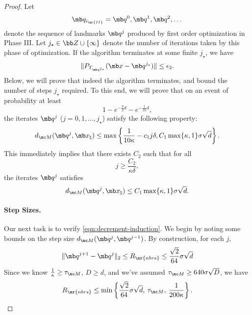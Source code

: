 \begin{proof}
Let 
\begin{equation}
    \mb q_{i_{\mr{II}}} = \mb q^0, \mb q^1, \mb q^2, \dots 
\end{equation}
denote the sequence of landmarks $\mb q^j$ produced by first order optimization in Phase III. Let $j_\star \in \bb Z \cup \{ \infty \}$ denote the number of iterations taken by this phase of optimization. If the algorithm terminates at some finite $j_\star$, we have 
\begin{equation}
    \| P_{T_{\mb q^{j_\star}}} (\mb x - \mb q^{j_\star} ) \| \le \epsilon_2. 
\end{equation}
Below, we will prove that indeed the algorithm terminates, and bound the number of steps $j_\star$ required. To this end, we will prove that on an event of probability at least 
\begin{equation}
    1 - e^{-\tfrac{9}{2} d} - e^{-\tfrac{1}{16} d},
\end{equation}
the iterates $\mb q^j$ ($j = 0,1,\dots, j_\star$) satisfy the following property:
\begin{equation} \label{eqn:decrement-induction}
    d_{\mc M}(\mb q^j, \mb x_\natural) \le \max\left\{ \frac{1}{10\kappa} -  c_1 j \delta, C_1 \max\{ \kappa, 1 \} \sigma \sqrt{d} \right\}.  
\end{equation}
This immediately implies that there exists $C_2$ such that for all 
\begin{equation}
j \ge  \frac{C_2}{\kappa \delta},
\end{equation} 
the iterates  $\mb q^j$ satisfies 
\begin{equation} 
d_{\mc M}( \mb q^j, \mb x_\natural ) \le C_1 \max\{ \kappa, 1 \} \sigma \sqrt{d}. 
\end{equation}

\paragraph{Step Sizes.} Our next task is to verify \eqref{eqn:decrement-induction}. We begin by noting some bounds on the step size $d_{\mc M}(\mb q^{j},\mb q^{j-1})$. By construction, for each $j$, 
\begin{equation}
    \|\mb q^{j+1} - \mb q^j \|_2 
    \leq R_{\mr{nbrs}} \le \frac{\sqrt{2}}{64}\sigma \sqrt{d}
\end{equation}
Since we know $\frac{1}{\kappa} \ge \tau_{\mc M}$, $D \ge d$, and we've assumed $
\tau_{\mc M}\ge 640 \sigma\sqrt{D}$, we have 
\begin{equation}
R_{\mr{nbrs}} \le \min\left\{\frac{\sqrt{2}}{64}\sigma \sqrt{d}, \: \tau_{\mc M}, \: \frac{1}{200\kappa}\right\}.
\end{equation}


\end{proof}
